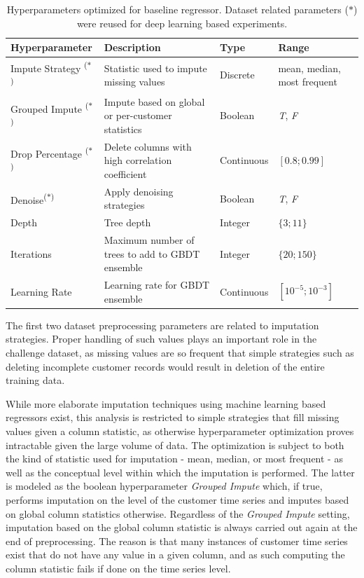 \documentclass[runningheads]{llncs}
\begin{document}
\begin{table}[h]
    \vspace{0.1cm}
    \centering
    \setlength{\tabcolsep}{0.5em}
    \def\arraystretch{1.1}
    \begin{tabular}{L{2.8cm} | L{4cm} | L{1.7cm} | L{2.5cm} }
    \hline
    \textbf{Hyperparameter} & \textbf{Description} & \textbf{Type} & \textbf{Range}\\
    \hline
    Impute Strategy \textsuperscript{($*$)}\ & Statistic used to impute missing values & Discrete & mean, median, most frequent\\
    Grouped Impute \textsuperscript{($*$)} & Impute based on global or per-customer statistics & Boolean & \emph{T}, \emph{F}\\
    Drop Percentage \textsuperscript{($*$)} & Delete columns with high correlation coefficient & Continuous & $[0.8; 0.99]$\\
    Denoise\textsuperscript{($*$)} & Apply denoising strategies & Boolean & \emph{T}, \emph{F}\\
    Depth & Tree depth & Integer & $\{3; 11\}$\\
    Iterations & Maximum number of trees to add to GBDT ensemble & Integer & $\{20; 150\}$\\
    Learning Rate & Learning rate for GBDT ensemble & Continuous & $[10^{-5}; 10^{-3}]$\\
    \hline
   \end{tabular}
   \vspace{0.1cm}
   \caption{Hyperparameters optimized for baseline regressor. Dataset related parameters ($*$) were reused for deep learning based experiments.}
   \label{tab:hyperparam-opt}
\end{table}

The first two dataset preprocessing parameters are related to imputation strategies.
Proper handling of such values plays an important role in the challenge dataset, as missing values are so frequent that simple strategies such as deleting incomplete customer records would result in deletion of the entire training data.

While more elaborate imputation techniques using machine learning based regressors exist, this analysis is restricted to simple strategies that fill missing values given a column statistic, as otherwise hyperparameter optimization proves intractable given the large volume of data. The optimization is subject to both the kind of statistic used for imputation - mean, median, or most frequent - as well as the conceptual level within which the imputation is performed. The latter is modeled as the boolean hyperparameter \emph{Grouped Impute} which, if true, performs imputation on the level of the customer time series and imputes based on global column statistics otherwise. Regardless of the \emph{Grouped Impute} setting, imputation based on the global column statistic is always carried out again at the end of preprocessing. The reason is that many instances of customer time series exist that do not have any value in a given column, and as such computing the column statistic fails if done on the time series level.
\end{document}
